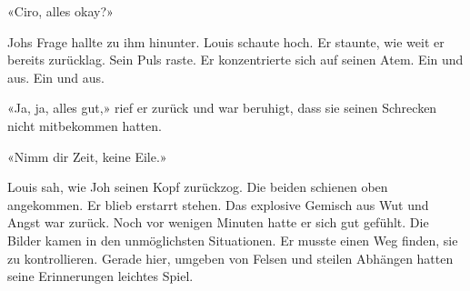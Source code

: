 «Ciro, alles okay?»

Johs Frage hallte zu ihm hinunter. Louis schaute hoch. Er
staunte, wie weit er bereits zurücklag.
Sein Puls raste. Er konzentrierte sich auf seinen Atem. Ein und aus. Ein
und aus.

«Ja, ja, alles gut,» rief er zurück und war beruhigt, dass sie seinen
Schrecken nicht mitbekommen hatten.

«Nimm dir Zeit, keine Eile.»

Louis sah, wie Joh seinen Kopf zurückzog. Die beiden schienen oben
angekommen.
Er blieb erstarrt stehen. Das explosive Gemisch aus Wut und Angst war
zurück. Noch vor wenigen Minuten hatte er sich gut gefühlt. Die Bilder
kamen in den unmöglichsten Situationen. Er musste einen
Weg finden, sie zu kontrollieren. Gerade hier,
umgeben von Felsen und steilen Abhängen hatten seine Erinnerungen
leichtes Spiel. 